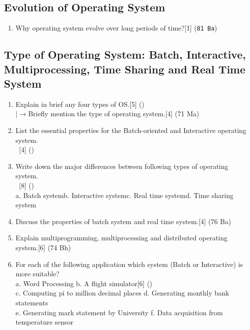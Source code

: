 \documentclass[12pt]{article}
\newcommand{\lb}{\left|\rightarrow\right.}
\newcommand{\enter}{\textcolor{white}{1}}\ExplSyntaxOn
\begin{document}
\subsection{Evolution of Operating System}
\begin{enumerate}
\item Why operating system evolve over long periods of time?\hfill[1] (\texttt{81 Ba})
\end{enumerate}
\subsection{Type of Operating System: Batch, Interactive, Multiprocessing, Time Sharing and Real Time System}
\begin{enumerate}
\item Explain in brief any four types of OS.\hfill[5] ()\\
$\lb$Briefly mention the type of operating system.\hfill[4] (71 Ma)
\item List the essential properties for the Batch-oriented and Interactive operating system.\\
\enter\hfill[4] ()
\item Write down the major differences between following types of operating system.\\
\enter\hfill[8] ()\\
a. Batch system\hspace{7mm}b. Interactive system\hspace{7mm}c. Real time system\hspace{7mm}d. Time sharing system
\item Discuss the properties of batch system and real time system.\hfill[4] (76 Ba)
\item Explain multiprogramming, multiprocessing and distributed operating system.\hfill[6] (74 Bh)
\item For each of the following application which system (Batch or Interactive) is more suitable?\\
a. Word Processing \hspace{5cm}b. A flight simulator\hfill[6] ()\\
c. Computing pi to million decimal places\hspace{9mm} d. Generating monthly bank statements\\ 
e. Generating mark statement by University \hspace{7mm}f. Data acquisition from temperature sensor
\end{enumerate}
\end{document}
